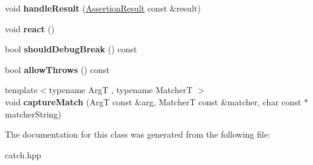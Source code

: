 \begin{DoxyCompactItemize}
\item 
\mbox{\label{classCatch_1_1ResultBuilder_ad8bb17e4ac590b75bf8630d8f3502f4e}} 
void {\bfseries handle\+Result} (\hyperlink{classCatch_1_1AssertionResult}{Assertion\+Result} const \&result)
\item 
\mbox{\label{classCatch_1_1ResultBuilder_a3085cdc46533d45bed6f652a2ac295c0}} 
void {\bfseries react} ()
\item 
\mbox{\label{classCatch_1_1ResultBuilder_a6f2b0dbcc6cc5e0a500ac45f2534e3e7}} 
bool {\bfseries should\+Debug\+Break} () const
\item 
\mbox{\label{classCatch_1_1ResultBuilder_a0428fd78ab9e8e6f1aca6855f20fc715}} 
bool {\bfseries allow\+Throws} () const
\item 
\mbox{\label{classCatch_1_1ResultBuilder_a27425538bec8fee7ac69403c5df6078c}} 
{\footnotesize template$<$typename ArgT , typename MatcherT $>$ }\\void {\bfseries capture\+Match} (ArgT const \&arg, MatcherT const \&matcher, char const $\ast$matcher\+String)
\end{DoxyCompactItemize}


The documentation for this class was generated from the following file\+:\begin{DoxyCompactItemize}
\item 
catch.\+hpp\end{DoxyCompactItemize}
